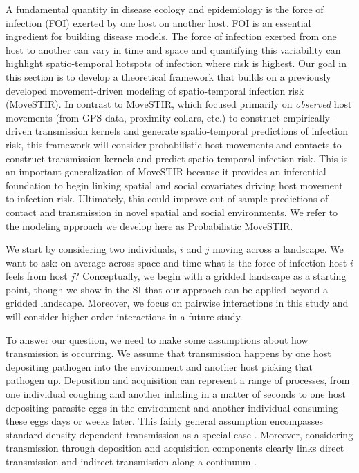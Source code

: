 \documentclass[letterpaper]{article}
\begin{document}
A fundamental quantity in disease ecology and epidemiology is the force of infection (FOI) exerted by one host on another host. FOI is an essential ingredient for building disease models.  The force of infection exerted from one host to another can vary in time and space and quantifying this variability can highlight spatio-temporal hotspots of infection where risk is highest.  Our goal in this section is to develop a theoretical framework that builds on a previously developed movement-driven modeling of spatio-temporal infection risk (MoveSTIR).  In contrast to MoveSTIR, which focused primarily on \emph{observed} host movements (from GPS data, proximity collars, etc.) to construct empirically-driven transmission kernels and generate spatio-temporal predictions of infection risk, this framework will consider probabilistic host movements and contacts to construct transmission kernels and predict spatio-temporal infection risk. This is an important generalization of MoveSTIR because it provides an inferential foundation to begin linking spatial and social covariates driving host movement to infection risk.  Ultimately, this could improve out of sample predictions of contact and transmission in novel spatial and social environments.  We refer to the modeling approach we develop here as Probabilistic MoveSTIR.     

We start by considering two individuals, $i$ and $j$ moving across a landscape.  We want to ask: on average across space and time what is the force of infection host $i$ feels from host $j$?   Conceptually, we begin with a gridded landscape as a starting point, though we show in the SI that our approach can be applied beyond a gridded landscape.  Moreover, we focus on pairwise interactions in this study and will consider higher order interactions in a future study.   

To answer our question, we need to make some assumptions about how transmission is occurring.  We assume that transmission happens by one host depositing pathogen into the environment and another host picking that pathogen up.  Deposition and acquisition can represent a range of processes, from one individual coughing and another inhaling in a matter of seconds to one host depositing parasite eggs in the environment and another individual consuming these eggs days or weeks later.  This fairly general assumption encompasses standard density-dependent transmission as a special case \citep{Cortez2021}.  Moreover, considering transmission through deposition and acquisition components clearly links direct transmission and indirect transmission along a continuum \citep{Wilber2022}.  
\end{document}
